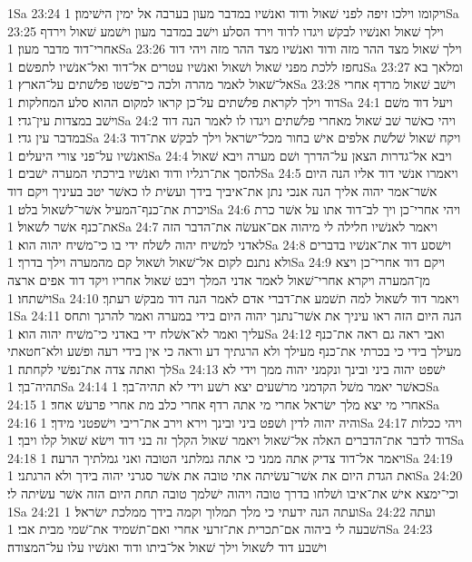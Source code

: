 1Sa 23:24  ויקומו וילכו זיפה לפני שׁאול ודוד ואנשׁיו במדבר מעון בערבה אל ימין הישׁימון׃
1Sa 23:25  וילך שׁאול ואנשׁיו לבקשׁ ויגדו לדוד וירד הסלע וישׁב במדבר מעון וישׁמע שׁאול וירדף אחרי־דוד מדבר מעון׃
1Sa 23:26  וילך שׁאול מצד ההר מזה ודוד ואנשׁיו מצד ההר מזה ויהי דוד נחפז ללכת מפני שׁאול ושׁאול ואנשׁיו עטרים אל־דוד ואל־אנשׁיו לתפשׂם׃
1Sa 23:27  ומלאך בא אל־שׁאול לאמר מהרה ולכה כי־פשׁטו פלשׁתים על־הארץ׃
1Sa 23:28  וישׁב שׁאול מרדף אחרי דוד וילך לקראת פלשׁתים על־כן קראו למקום ההוא סלע המחלקות׃
1Sa 24:1  ויעל דוד משׁם וישׁב במצדות עין־גדי׃
1Sa 24:2  ויהי כאשׁר שׁב שׁאול מאחרי פלשׁתים ויגדו לו לאמר הנה דוד במדבר עין גדי׃
1Sa 24:3  ויקח שׁאול שׁלשׁת אלפים אישׁ בחור מכל־ישׂראל וילך לבקשׁ את־דוד ואנשׁיו על־פני צורי היעלים׃
1Sa 24:4  ויבא אל־גדרות הצאן על־הדרך ושׁם מערה ויבא שׁאול להסך את־רגליו ודוד ואנשׁיו בירכתי המערה ישׁבים׃
1Sa 24:5  ויאמרו אנשׁי דוד אליו הנה היום אשׁר־אמר יהוה אליך הנה אנכי נתן את־איביך בידך ועשׂית לו כאשׁר יטב בעיניך ויקם דוד ויכרת את־כנף־המעיל אשׁר־לשׁאול בלט׃
1Sa 24:6  ויהי אחרי־כן ויך לב־דוד אתו על אשׁר כרת את־כנף אשׁר לשׁאול׃
1Sa 24:7  ויאמר לאנשׁיו חלילה לי מיהוה אם־אעשׂה את־הדבר הזה לאדני למשׁיח יהוה לשׁלח ידי בו כי־משׁיח יהוה הוא׃
1Sa 24:8  וישׁסע דוד את־אנשׁיו בדברים ולא נתנם לקום אל־שׁאול ושׁאול קם מהמערה וילך בדרך׃
1Sa 24:9  ויקם דוד אחרי־כן ויצא מן־המערה ויקרא אחרי־שׁאול לאמר אדני המלך ויבט שׁאול אחריו ויקד דוד אפים ארצה וישׁתחו׃
1Sa 24:10  ויאמר דוד לשׁאול למה תשׁמע את־דברי אדם לאמר הנה דוד מבקשׁ רעתך׃
1Sa 24:11  הנה היום הזה ראו עיניך את אשׁר־נתנך יהוה היום בידי במערה ואמר להרגך ותחס עליך ואמר לא־אשׁלח ידי באדני כי־משׁיח יהוה הוא׃
1Sa 24:12  ואבי ראה גם ראה את־כנף מעילך בידי כי בכרתי את־כנף מעילך ולא הרגתיך דע וראה כי אין בידי רעה ופשׁע ולא־חטאתי לך ואתה צדה את־נפשׁי לקחתה׃
1Sa 24:13  ישׁפט יהוה ביני ובינך ונקמני יהוה ממך וידי לא תהיה־בך׃
1Sa 24:14  כאשׁר יאמר משׁל הקדמני מרשׁעים יצא רשׁע וידי לא תהיה־בך׃
1Sa 24:15  אחרי מי יצא מלך ישׂראל אחרי מי אתה רדף אחרי כלב מת אחרי פרעשׁ אחד׃
1Sa 24:16  והיה יהוה לדין ושׁפט ביני ובינך וירא וירב את־ריבי וישׁפטני מידך׃
1Sa 24:17  ויהי ככלות דוד לדבר את־הדברים האלה אל־שׁאול ויאמר שׁאול הקלך זה בני דוד וישׂא שׁאול קלו ויבך׃
1Sa 24:18  ויאמר אל־דוד צדיק אתה ממני כי אתה גמלתני הטובה ואני גמלתיך הרעה׃
1Sa 24:19  ואת הגדת היום את אשׁר־עשׂיתה אתי טובה את אשׁר סגרני יהוה בידך ולא הרגתני׃
1Sa 24:20  וכי־ימצא אישׁ את־איבו ושׁלחו בדרך טובה ויהוה ישׁלמך טובה תחת היום הזה אשׁר עשׂיתה לי׃
1Sa 24:21  ועתה הנה ידעתי כי מלך תמלוך וקמה בידך ממלכת ישׂראל׃
1Sa 24:22  ועתה השׁבעה לי ביהוה אם־תכרית את־זרעי אחרי ואם־תשׁמיד את־שׁמי מבית אבי׃
1Sa 24:23  וישׁבע דוד לשׁאול וילך שׁאול אל־ביתו ודוד ואנשׁיו עלו על־המצודה׃
